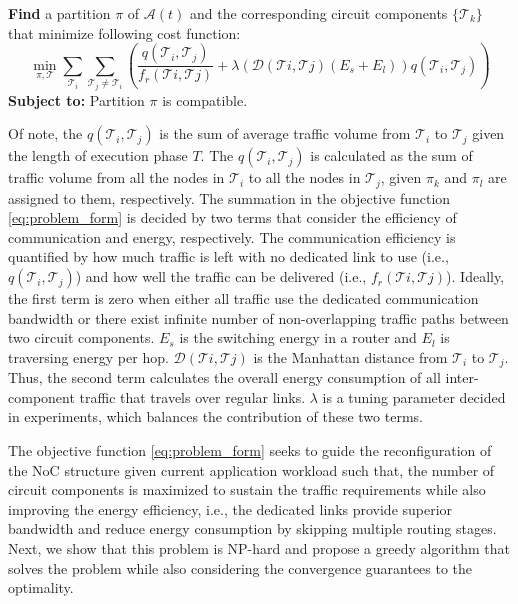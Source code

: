 {{\noindent\textbf{Find} a  partition $\pi$ of $\mathcal A(t) $ and the corresponding circuit components $\{ \mathcal T_{k}\}$ that minimize following cost function:
\begin{equation}\label{eq:problem_form}
\min\limits_{\pi,\mathcal T} \sum_{\mathcal T_{i}} \sum_{\mathcal T_{j}\neq \mathcal T_{i}} (\frac{q(\mathcal T_{i},\mathcal T_{j})}{f_r(\mathcal T{i},\mathcal T{j})}+\lambda(\mathcal D(\mathcal T{i},\mathcal T{j})(E_{s}+E_{l}))q(\mathcal T_{i},\mathcal T_{j}))
\end{equation}
\noindent\textbf{Subject to:} Partition $\pi$ is compatible.

\noindent Of note, the $q(\mathcal T_{i},\mathcal T_{j})$ is the sum of average traffic volume from $\mathcal T_{i}$ to $\mathcal T_{j}$ given the length of execution phase $T$. The $q(\mathcal T_{i},\mathcal T_{j})$ is calculated as the sum of traffic volume from all the nodes in $\mathcal T_{i}$ to all the nodes in $\mathcal T_{j}$, given $\pi_{k}$ and $\pi_{l}$ are assigned to them, respectively. The summation in the objective function \eqref{eq:problem_form} is decided by two terms that consider the efficiency of communication and energy, respectively. The communication efficiency is quantified by how much traffic is left with no dedicated link to use (i.e., $q(\mathcal T_{i},\mathcal T_{j})$) and how well the traffic can be delivered (i.e., $f_{r}(\mathcal T{i},\mathcal T{j})$). Ideally, the first term is zero when either all traffic use the dedicated communication bandwidth or there exist infinite number of non-overlapping traffic paths between two circuit components. $E_{s}$ is the switching energy in a router and $E_{l}$ is traversing energy per hop. $\mathcal D(\mathcal T{i},\mathcal T{j})$ is the Manhattan distance from $\mathcal T_{i}$ to $\mathcal T_{j}$. Thus, the second term calculates the overall energy consumption of all inter-component traffic that travels over regular links. $\lambda$ is a tuning parameter decided in experiments, which balances the contribution of these two terms.

The objective function \eqref{eq:problem_form} seeks to guide the reconfiguration of the NoC structure given current application workload such that, the number of circuit components is maximized to sustain the traffic requirements while also improving the energy efficiency, i.e., the dedicated links provide superior bandwidth and reduce energy consumption by skipping multiple routing stages. Next, we show that this problem is NP-hard and propose a greedy algorithm that solves the problem while also considering the convergence guarantees to the optimality.

}}
